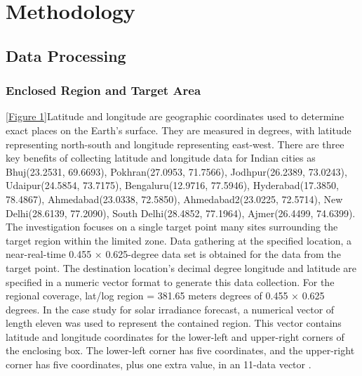 
\chapter{Methodology} %

\label{c4} %


\section{Data Processing}

\subsection{Enclosed Region and Target Area}
\ref{Figure 1}Latitude and longitude are geographic coordinates used to determine exact places on the Earth's surface. They are measured in degrees, with latitude representing north-south and longitude representing east-west. There are three key benefits of collecting latitude and longitude data for Indian cities as Bhuj(23.2531, 69.6693), Pokhran(27.0953, 71.7566), Jodhpur(26.2389, 73.0243), Udaipur(24.5854, 73.7175), Bengaluru(12.9716, 77.5946), Hyderabad(17.3850, 78.4867), Ahmedabad(23.0338, 72.5850), Ahmedabad2(23.0225, 72.5714), New Delhi(28.6139, 77.2090), South Delhi(28.4852, 77.1964), Ajmer(26.4499, 74.6399). The investigation focuses on a single target point many sites surrounding the target region within the limited zone. Data gathering at the specified location, a near-real-time 0.455 × 0.625-degree data set is obtained for the data from the target point. The destination location's decimal degree longitude and latitude are specified in a numeric vector format to generate this data collection. For the regional coverage, lat/log region = 381.65 meters degrees of 0.455 × 0.625 degrees. In the case study for solar irradiance forecast, a numerical vector of length eleven was used to represent the contained region. This vector contains latitude and longitude coordinates for the lower-left and upper-right corners of the enclosing box. The lower-left corner has five coordinates, and the upper-right corner has five coordinates, plus one extra value, in an 11-data vector \cite{belmahdi2020one}.

